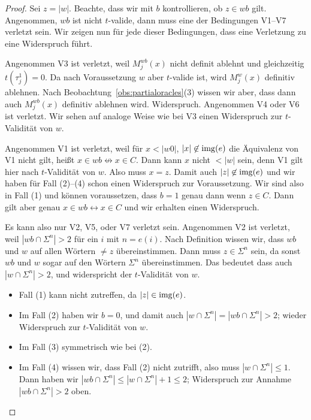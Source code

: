 \begin{proof}
    Sei $z=|w|$. Beachte, dass wir mit $b$ kontrollieren, ob $z\in wb$ gilt.
    Angenommen, $wb$ ist nicht $t$-valide, dann muss eine der Bedingungen V1--V7 verletzt sein.
    Wir zeigen nun für jede dieser Bedingungen, dass eine Verletzung zu eine Widerspruch führt.

    Angenommen V3 ist verletzt, weil $M_j^{wb}(x)$ nicht definit ablehnt und gleichzeitig $t(\tau_j^1)=0$. Da nach Voraussetzung $w$ aber $t$-valide ist, wird $M_j^{w}(x)$ definitiv ablehnen.
    Nach Beobachtung~\ref{obs:partialoracles}(3) wissen wir aber, dass dann auch $M_j^{wb}(x)$ definitiv ablehnen wird. Widerspruch.
    Angenommen V4 oder V6 ist verletzt. Wir sehen auf analoge Weise wie bei V3 einen Widerspruch zur $t$-Validität von $w$.

    Angenommen V1 ist verletzt, weil für $x<|w0|$, $|x|\not\in\operatorname{img}(e)$ die Äquivalenz von V1 nicht gilt, heißt $x\in wb \not\leftrightarrow x\in C$. Dann kann $x$ nicht $<|w|$ sein, denn V1 gilt hier nach $t$-Validität von $w$. Also muss $x=z$.
    Damit auch $|z|\not\in\operatorname{img}(e)$ und wir haben für Fall (2)--(4) schon einen Widerspruch zur Voraussetzung.
    Wir sind also in Fall (1) und können voraussetzen, dass $b=1$ genau dann wenn $z\in C$.
    Dann gilt aber genau $x\in wb\leftrightarrow x\in C$ und wir erhalten einen Widerspruch.

    Es kann also nur V2, V5, oder V7 verletzt sein.
    Angenommen V2 ist verletzt, weil $|wb\cap\Sigma^{n}|>2$ für ein $i$ mit $n=e(i)$.
    Nach Definition wissen wir, dass $wb$ und $w$ auf allen Wörtern $\neq z$ übereinstimmen.
    Dann muss $z\in\Sigma^n$ sein, da sonst $wb$ und $w$ sogar auf den Wörtern $\Sigma^n$ übereinstimmen.
    Das bedeutet dass auch $|w\cap\Sigma^n|>2$, und widerspricht der $t$-Validität von $w$.
    \begin{itemize}[nosep]
        \item Fall (1) kann nicht zutreffen, da $|z|\in\operatorname{img}(e)$.
        \item Im Fall (2) haben wir $b=0$, und damit auch $|w\cap\Sigma^n|=|wb\cap\Sigma^n|>2$; wieder Widerspruch zur $t$-Validität von $w$.
        \item Im Fall (3) symmetrisch wie bei (2).
        \item Im Fall (4) wissen wir, dass Fall (2) nicht zutrifft, also muss $|w\cap\Sigma^n|\leq 1$.
            Dann haben wir $|wb\cap\Sigma^n|\leq |w\cap\Sigma^n|+1 \leq 2$; Widerspruch zur Annahme $|wb\cap\Sigma^{n}|>2$ oben.
    \end{itemize}


\end{proof}

